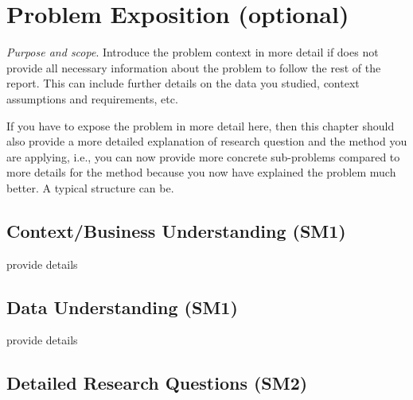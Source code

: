 \chapter{Problem Exposition (optional)}\label{sec:problem-exposition}

\emph{Purpose and scope}.
Introduce the problem context in more detail if  does not provide all necessary information about the problem to follow the rest of the report.
This can include further details on the data you studied, context assumptions and requirements, etc.

If you have to expose the problem in more detail here, then this chapter should also provide a more detailed explanation of research question and the method you are applying, i.e., you can now provide more concrete sub-problems compared to  more details for the method  because you now have explained the problem much better.
A typical structure can be.

\section{Context/Business Understanding (SM1)}\label{sec:problem-exposition:context-understanding}

provide details

\section{Data Understanding (SM1)}\label{sec:problem-exposition:data-understanding}

provide details

\section{Detailed Research Questions (SM2)}\label{sec:problem-exposition:research-problems}

